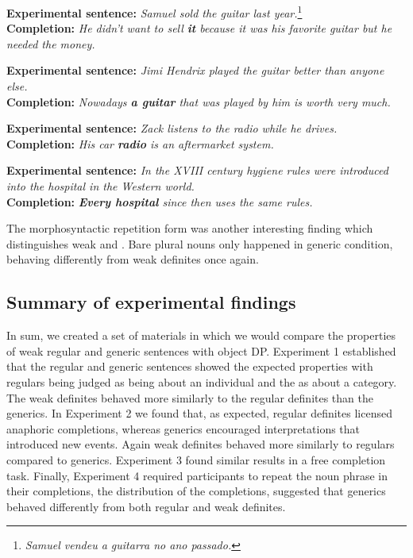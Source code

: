 \documentclass[output=paper,
modfonts
]{langscibook}
\begin{document}
\ea \label{ex:desaetal:22}
\textbf{Experimental sentence:} \textit{Samuel sold the guitar last year.}\footnote{\textit{Samuel vendeu a guitarra no ano passado.}}
\\ \textbf{Completion:} \textit{He didn't want to sell \textbf{it} because it was his favorite guitar but he needed the money.} 
\z

\ea \label{ex:desaetal:23}
\textbf{Experimental sentence:} \textit{Jimi Hendrix played the guitar better than anyone else.}
\\ \textbf{Completion:} \textit{Nowadays \textbf{a guitar} that was played by him is worth very much.} 
\z

\ea \label{ex:desaetal:24}
\textbf{Experimental sentence:} \textit{Zack listens to the	 radio while he drives.}
\\ \textbf{Completion:} \textit{His car \textbf{radio} is an aftermarket system.} 
\z

\ea \label{ex:desaetal:25}
\textbf{Experimental sentence:} \textit{In the XVIII century hygiene rules were introduced into the hospital in the Western world.}
\\ \textbf{Completion:} \textit{ \textbf{Every hospital} since then uses the same rules.}
\z

The morphosyntactic repetition form was another interesting finding which distinguishes weak and . Bare plural nouns only happened in generic condition, behaving differently from weak definites once again.

\subsection{Summary of experimental findings}

In sum, we created a set of materials in which we would compare the properties of weak regular and generic sentences with object DP.  Experiment 1 established that the regular and generic sentences showed the expected properties with regulars being judged as being about an individual and the  as about a category.  The weak definites behaved more similarly to the regular definites than the generics.  In Experiment 2 we found that, as expected, regular definites licensed anaphoric completions, whereas generics  encouraged interpretations that introduced new events.  Again weak definites behaved more similarly to regulars compared to generics.  Experiment 3 found similar results in a free completion task.  Finally, Experiment 4 required participants to repeat the noun phrase in their completions, the distribution of the completions, suggested that generics behaved differently from both regular and weak definites.
 
\end{document}
